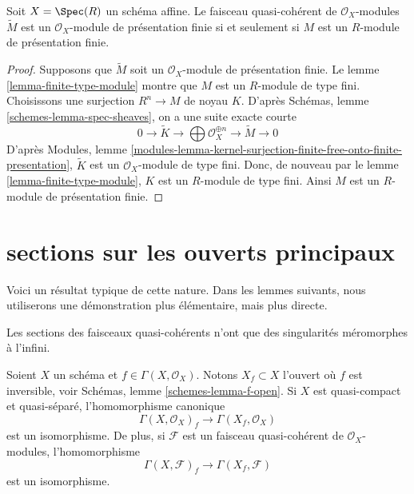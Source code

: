 \begin{lemma}
\label{lemma-finite-presentation-module}
Soit $X = \Spec(R)$ un schéma affine. Le faisceau quasi-cohérent
de $\mathcal{O}_X$-modules $\widetilde M$ est un $\mathcal{O}_X$-module de
présentation finie si et seulement si $M$ est un $R$-module de présentation finie.
\end{lemma}

\begin{proof}
Supposons que $\widetilde M$ soit un $\mathcal{O}_X$-module de présentation finie.
Le lemme \ref{lemma-finite-type-module} montre que $M$ est un $R$-module de
type fini. Choisissons une surjection $R^n \to M$ de noyau $K$.
D'après Schémas, lemme \ref{schemes-lemma-spec-sheaves},
on a une suite exacte courte
$$
0 \to \widetilde{K} \to
\bigoplus \mathcal{O}_X^{\oplus n} \to
\widetilde{M} \to 0
$$
D'après
Modules, lemme
\ref{modules-lemma-kernel-surjection-finite-free-onto-finite-presentation},
$\widetilde{K}$ est un $\mathcal{O}_X$-module de type
fini. Donc, de nouveau par le lemme \ref{lemma-finite-type-module},
$K$ est un $R$-module de type
fini. Ainsi $M$ est un $R$-module de présentation finie.
\end{proof}







\section{sections sur les ouverts principaux}
\label{section-principal-opens}

\noindent
Voici un résultat typique de cette nature. Dans les lemmes suivants, nous utiliserons
une démonstration plus élémentaire, mais plus directe.

\begin{lemma}
\label{lemma-invert-f-sections}
\begin{slogan}
Les sections des faisceaux quasi-cohérents n'ont que des singularités
méromorphes à l'infini.
\end{slogan}
Soient $X$ un schéma et $f \in \Gamma(X, \mathcal{O}_X)$.
Notons $X_f \subset X$ l'ouvert où $f$ est inversible, voir
Schémas, lemme \ref{schemes-lemma-f-open}.
Si $X$ est quasi-compact et quasi-séparé, l'homomorphisme canonique
$$
\Gamma(X, \mathcal{O}_X)_f \longrightarrow \Gamma(X_f, \mathcal{O}_X)
$$
est un isomorphisme. De plus, si $\mathcal{F}$ est un faisceau
quasi-cohérent de $\mathcal{O}_X$-modules, l'homomorphisme
$$
\Gamma(X, \mathcal{F})_f \longrightarrow \Gamma(X_f, \mathcal{F})
$$
est un isomorphisme.
\end{lemma}

